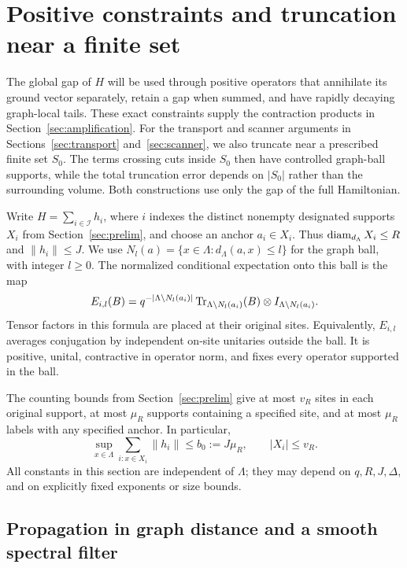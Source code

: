 \section{Positive constraints and truncation near a finite set}
\label{sec:quasilocal}

The global gap of $H$ will be used through positive operators that annihilate
its ground vector separately, retain a gap when summed, and have rapidly
decaying graph-local tails.  These exact constraints supply the contraction
products in Section~\ref{sec:amplification}.  For the transport and scanner
arguments in Sections~\ref{sec:transport} and~\ref{sec:scanner}, we also
truncate near a prescribed finite set $S_0$.  The terms crossing cuts inside
$S_0$ then have controlled graph-ball supports, while the total truncation
error depends on $|S_0|$ rather than the surrounding volume.  Both
constructions use only the gap of the full Hamiltonian.

Write $H=\sum_{i\in\mathcal I}h_i$, where $i$ indexes the distinct nonempty
designated supports $X_i$ from Section~\ref{sec:prelim}, and choose an anchor
$a_i\in X_i$.  Thus $\operatorname{diam}_{d_\Lambda}X_i\le R$ and $\|h_i\|\le J$.
We use $N_l(a)=\{x\in\Lambda:d_\Lambda(a,x)\le l\}$ for the graph ball,
with integer $l\ge0$.  The normalized conditional expectation onto this ball
is the map
\begin{equation}
 E_{i,l}(B)=q^{-|\Lambda\setminus N_l(a_i)|}
       \operatorname{Tr}_{\Lambda\setminus N_l(a_i)}(B)
       \otimes I_{\Lambda\setminus N_l(a_i)}.
 \label{eq:quasilocal-ce}
\end{equation}
Tensor factors in this formula are placed at their original sites.
Equivalently, $E_{i,l}$ averages conjugation by independent on-site unitaries
outside the ball.  It is positive, unital, contractive in operator norm, and
fixes every operator supported in the ball.

The counting bounds from Section~\ref{sec:prelim} give at most $v_R$
sites in each original support, at most $\mu_R$ supports containing a
specified site, and at most $\mu_R$ labels with any specified anchor.
In particular,
\begin{equation}
 \sup_{x\in\Lambda}\sum_{i:x\in X_i}\|h_i\|\le b_0:=J\mu_R,
 \qquad |X_i|\le v_R.
 \label{eq:quasilocal-budget}
\end{equation}
All constants in this section are independent of $\Lambda$; they may depend
on $q,R,J,\Delta$, and on explicitly fixed exponents or size bounds.

\subsection{Propagation in graph distance and a smooth spectral filter}

